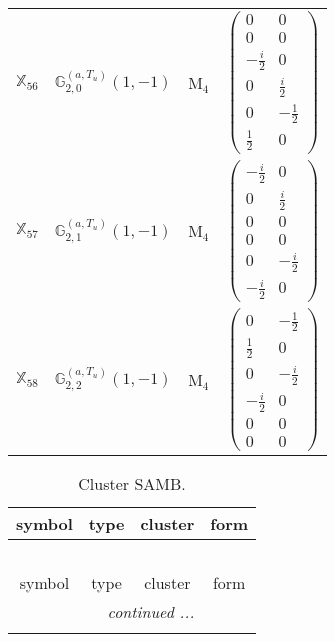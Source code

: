 \documentclass[fleqn,10pt,landscape]{article}
\begin{document}
\begin{itemize}
\begin{center}
\begin{longtable}{c|c|c|c}
$ \mathbb{X}_{56} $ & $\mathbb{G}_{2,0}^{(a,T_{u})}(1,-1)$ & M$_{4}$ & $\begin{pmatrix} 0 & 0 \\ 0 & 0 \\ - \frac{i}{2} & 0 \\ 0 & \frac{i}{2} \\ 0 & - \frac{1}{2} \\ \frac{1}{2} & 0 \end{pmatrix}$ \\
$ \mathbb{X}_{57} $ & $\mathbb{G}_{2,1}^{(a,T_{u})}(1,-1)$ & M$_{4}$ & $\begin{pmatrix} - \frac{i}{2} & 0 \\ 0 & \frac{i}{2} \\ 0 & 0 \\ 0 & 0 \\ 0 & - \frac{i}{2} \\ - \frac{i}{2} & 0 \end{pmatrix}$ \\
$ \mathbb{X}_{58} $ & $\mathbb{G}_{2,2}^{(a,T_{u})}(1,-1)$ & M$_{4}$ & $\begin{pmatrix} 0 & - \frac{1}{2} \\ \frac{1}{2} & 0 \\ 0 & - \frac{i}{2} \\ - \frac{i}{2} & 0 \\ 0 & 0 \\ 0 & 0 \end{pmatrix}$ \\
\end{longtable}
\end{center}
\begin{center}
\renewcommand{\arraystretch}{1.3}
\begin{longtable}{c|c|c|c}
\caption{Cluster SAMB.}
 \\
 \hline \hline
symbol & type & cluster & form \\ \hline \endfirsthead

\multicolumn{3}{l}{\tablename\ \thetable{}} \\
 \hline \hline
symbol & type & cluster & form \\ \hline \endhead

 \hline \hline
\multicolumn{3}{r}{\footnotesize\it continued ...} \\ \endfoot


\end{longtable}
\end{center}
\end{itemize}
\end{document}

